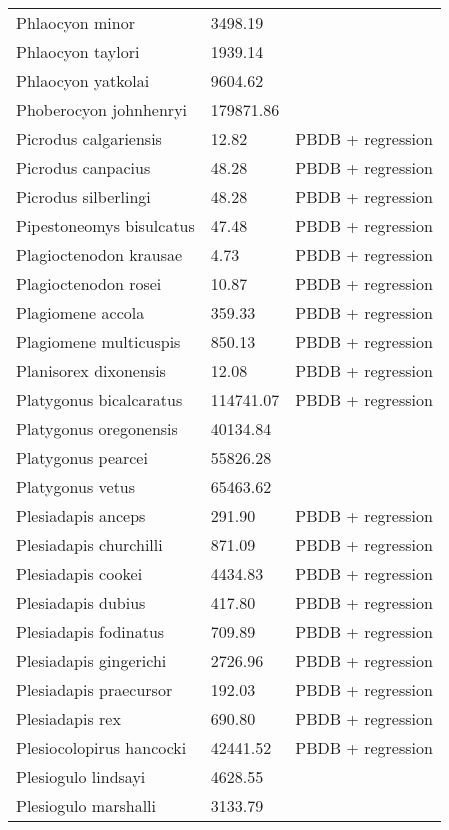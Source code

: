 \begin{center}
\begin{longtable}{p{} p{} p{} }
  Phlaocyon minor & 3498.19 & \cite{Tomiya2013} \\ 
  Phlaocyon taylori & 1939.14 & \cite{Tomiya2013} \\ 
  Phlaocyon yatkolai & 9604.62 & \cite{Tomiya2013} \\ 
  Phoberocyon johnhenryi & 179871.86 & \cite{Tomiya2013} \\ 
  Picrodus calgariensis & 12.82 & PBDB + regression \\ 
  Picrodus canpacius & 48.28 & PBDB + regression \\ 
  Picrodus silberlingi & 48.28 & PBDB + regression \\ 
  Pipestoneomys bisulcatus & 47.48 & PBDB + regression \\ 
  Plagioctenodon krausae & 4.73 & PBDB + regression \\ 
  Plagioctenodon rosei & 10.87 & PBDB + regression \\ 
  Plagiomene accola & 359.33 & PBDB + regression \\ 
  Plagiomene multicuspis & 850.13 & PBDB + regression \\ 
  Planisorex dixonensis & 12.08 & PBDB + regression \\ 
  Platygonus bicalcaratus & 114741.07 & PBDB + regression \\ 
  Platygonus oregonensis & 40134.84 & \cite{Tomiya2013} \\ 
  Platygonus pearcei & 55826.28 & \cite{Tomiya2013} \\ 
  Platygonus vetus & 65463.62 & \cite{Brook2004a} \\ 
  Plesiadapis anceps & 291.90 & PBDB + regression \\ 
  Plesiadapis churchilli & 871.09 & PBDB + regression \\ 
  Plesiadapis cookei & 4434.83 & PBDB + regression \\ 
  Plesiadapis dubius & 417.80 & PBDB + regression \\ 
  Plesiadapis fodinatus & 709.89 & PBDB + regression \\ 
  Plesiadapis gingerichi & 2726.96 & PBDB + regression \\ 
  Plesiadapis praecursor & 192.03 & PBDB + regression \\ 
  Plesiadapis rex & 690.80 & PBDB + regression \\ 
  Plesiocolopirus hancocki & 42441.52 & PBDB + regression \\ 
  Plesiogulo lindsayi & 4628.55 & \cite{Tomiya2013} \\ 
  Plesiogulo marshalli & 3133.79 & \cite{Tomiya2013} \\ 

\end{longtable}
\end{center}
